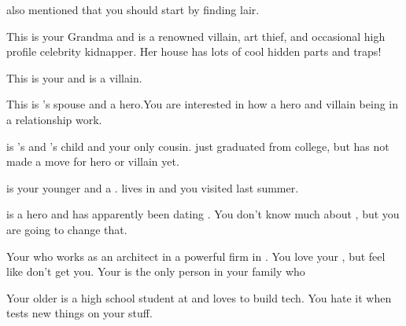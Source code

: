 \documentclass[char]{LRSguildcamp1}
\begin{document}
\begin{itemz}[Notes]
	\item \cGrandma{} also mentioned that you should start by finding \cGrandma{\their} lair.
	
\end{itemz}
\begin{contacts}
	\contact{\cGrandma{}} This is your Grandma and is a renowned villain, art thief, and occasional high profile celebrity kidnapper. Her house has lots of cool hidden parts and traps!
	
	\contact{\cOldest{}} This is your \cOldest{\uncle} and is a villain. 
	
	\contact{\cOS{}} This is \cOldest{}'s spouse and a hero.You are interested in how a hero and villain being in a relationship work. 
	
	\contact{\cGrad{}} \cGrad{} is \cOldest{}'s and \cOS{}'s child and your only cousin. \cGrad{\They} just graduated from college, but has not made a move for hero or villain yet. 
	
	\contact{\cYoungest{}} \cYoungest{} is your younger \cYoungest{\uncle} and a \cYoungest{\hero}. \cYoungest{} lives in \pCityYoungest{} and you visited \cYoungest{\them} last summer.  
	
	\contact{\cYS{}} \cYS{} is a hero and has apparently been dating \cYoungest{}. You don't know much about \cYS{\them}, but you are going to change that. 
	
	\contact{\cArchitect{}} Your \cArchitect{\parent} who works as an architect in a powerful firm in \pCityArchitect{}.  You love your \cArchitect{\parent}, but feel like \cArchitect{\they} don't get you. Your \cArchitect{\parent} is the only person in your family who 
	
	 	\contact{\cTeen{}} Your older \cTeen{\sibling} is a high school student at \pNormalSchool{} and loves to build tech. You hate it when \cTeen{} tests new things on your stuff. 
		
\end{contacts}
\end{document}

